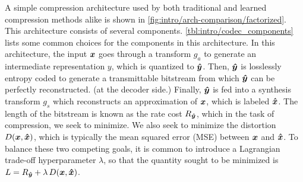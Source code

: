 A simple compression architecture used by both traditional and learned compression methods alike is shown in \cref{fig:intro/arch-comparison/factorized}.
This architecture consists of several components.
\cref{tbl:intro/codec_components} lists some common choices for the components in this architecture.
In this architecture, the input ${\boldsymbol{x}}$ goes through a transform $g_a$ to generate an intermediate representation $y$, which is quantized to ${\boldsymbol{\hat{y}}}$.
Then, ${\boldsymbol{\hat{y}}}$ is losslessly entropy coded to generate a transmittable bitstream from which ${\boldsymbol{\hat{y}}}$ can be perfectly reconstructed.
(at the decoder side.)
Finally, ${\boldsymbol{\hat{y}}}$ is fed into a synthesis transform $g_s$ which reconstructs an approximation of ${\boldsymbol{x}}$, which is labeled ${\boldsymbol{\hat{x}}}$.
The length of the bitstream is known as the rate cost $R_{{\boldsymbol{\hat{y}}}}$, which in the task of compression, we seek to minimize.
We also seek to minimize the distortion $D({\boldsymbol{x}}, {\boldsymbol{\hat{x}}})$, which is typically the mean squared error (MSE) between ${\boldsymbol{x}}$ and ${\boldsymbol{\hat{x}}}$.
To balance these two competing goals, it is common to introduce a Lagrangian trade-off hyperparameter $\lambda$, so that the quantity sought to be minimized is $L = R_{{\boldsymbol{\hat{y}}}} + \lambda \, D({\boldsymbol{x}}, {\boldsymbol{\hat{x}}})$.



